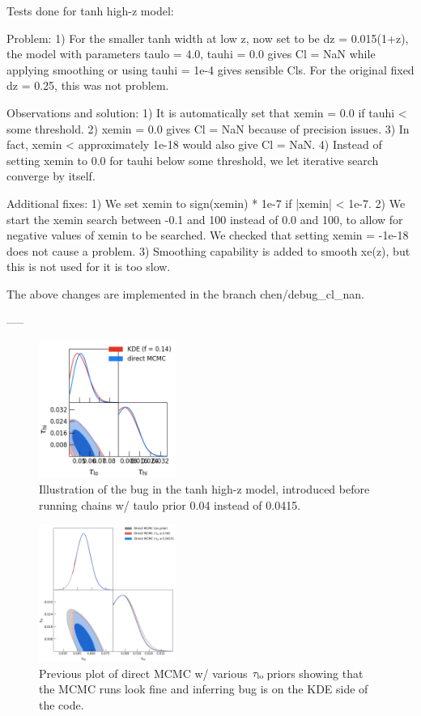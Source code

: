 \documentclass[prd,amsmath,amssymb,floatfix,superscriptaddress,nofootinbib]{revtex4-1}
\newcommand{\taulo}{$\tau_{\rm lo}\,$}
\begin{document}
Tests done for tanh high-z model:

Problem:
1) For the smaller tanh width at low z, now set to be dz = 0.015(1+z), the model with parameters taulo = 4.0, tauhi = 0.0 gives Cl = NaN while applying smoothing or using tauhi = 1e-4 gives sensible Cls. For the original fixed dz = 0.25, this was not problem.

Observations and solution:
1) It is automatically set that xemin = 0.0 if tauhi < some threshold. 
2) xemin = 0.0 gives Cl = NaN because of precision issues.
3) In fact, xemin < approximately 1e-18 would also give Cl = NaN.
4) Instead of setting xemin to 0.0 for tauhi below some threshold, we let iterative search converge by itself.

Additional fixes:
1) We set xemin to sign(xemin) * 1e-7 if |xemin| < 1e-7. 
2) We start the xemin search between -0.1 and 100 instead of 0.0 and 100, to allow for negative values of xemin to be searched. We checked that setting xemin = -1e-18 does not cause a problem.
3) Smoothing capability is added to smooth xe(z), but this is not used for it is too slow. 

The above changes are implemented in the branch chen/debug\_cl\_nan.

-----


\begin{figure}
\includegraphics[width=0.4\textwidth]{results/cosmomc_kde/taulo_prior_test/relike_tanh_highz_f0p14_taulo_prior_0p04_with_derived_parameters_zre_greater_than_6p25_tri.png}
\caption{Illustration of the bug in the tanh high-z model, introduced before running chains w/ taulo prior 0.04 instead of 0.0415.
}
\label{fig:}
\end{figure}

\begin{figure}
\includegraphics[width=0.4\textwidth]{cosmomc_kde/plot_tanh_highz_direct_mcmc_with_taulo_priors.png}
\caption{Previous plot of direct MCMC w/ various \taulo priors showing that the MCMC runs look fine and inferring bug is on the KDE side of the code.
} 
\label{fig:}
\end{figure}
\end{document}
